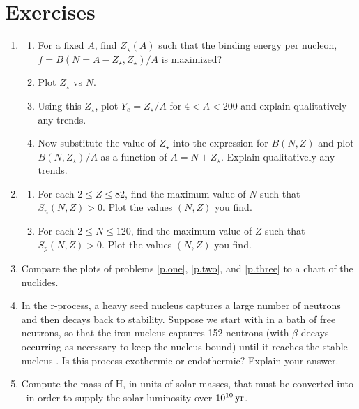 \section{Exercises}

\begin{enumerate}
\item 
\begin{enumerate}
\item For a fixed $A$, find $Z_\star(A)$ such that the binding energy per nucleon, $f = B(N=A-Z_{\star},Z_{\star})/A$ is maximized?  
\item\label{p.one} Plot $Z_{\star}$ vs $N$.
\item Using this $Z_{\star}$, plot $Y_{e}=Z_{\star}/A$ for $4 < A < 200$ and explain qualitatively any trends.
\item Now substitute the value of $Z_{\star}$ into the expression for $B(N,Z)$ and plot $B(N,Z_{\star})/A$ as a function of $A = N + Z_{\star}$. Explain qualitatively any trends.
\end{enumerate}
\item
\begin{enumerate}
\item\label{p.two} For each $2\le Z\le 82$, find the maximum value of $N$ such that $S_{n}(N,Z) > 0$.  Plot the values $(N,Z)$ you find.  
\item\label{p.three} For each $2\le N\le 120$, find the maximum value of $Z$ such that $S_{p}(N,Z) > 0$. Plot the values $(N,Z)$ you find. 
\end{enumerate}

\item Compare the plots of problems \ref{p.one}, \ref{p.two}, and \ref{p.three} to a chart of the nuclides.

\item In the r-process, a heavy seed nucleus captures a large number of neutrons and then decays back to stability.  Suppose we start with \iron[56] in a bath of free neutrons, so that the iron nucleus captures 152 neutrons (with $\beta$-decays occurring as necessary to keep the nucleus bound) until it reaches the stable nucleus \lead[208].  Is this process exothermic or endothermic? Explain your answer.

\item Compute the mass of H, in units of solar masses, that must be converted into \helium\ in order to supply the solar luminosity over $10^{10}\,\mathrm{yr}$.
\end{enumerate}

 